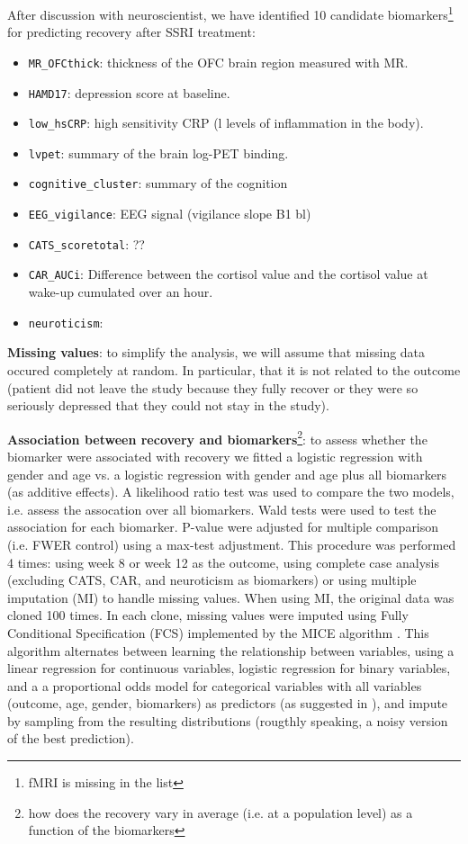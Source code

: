 \documentclass[12pt]{article}
\begin{document}
After discussion with neuroscientist, we have identified 10 candidate
biomarkers\footnote{fMRI is missing in the list} for predicting recovery after SSRI treatment:
\begin{itemize}
\item \texttt{MR\_OFCthick}: thickness of the OFC brain region measured with MR.
\item \texttt{HAMD17}: depression score at baseline.
\item \texttt{low\_hsCRP}: high sensitivity CRP (l levels of inflammation in the body).
\item \texttt{lvpet}: summary of the brain log-PET binding.
\item \texttt{cognitive\_cluster}: summary of the cognition
\item \texttt{EEG\_vigilance}: EEG signal (vigilance slope B1 bl)
\item \texttt{CATS\_scoretotal}: ??
\item \texttt{CAR\_AUCi}: Difference between the cortisol value and the cortisol value at wake-up cumulated over an hour.
\item \texttt{neuroticism}:
\end{itemize}

\bigskip

\textbf{Missing values}: to simplify the analysis, we will assume that
missing data occured completely at random. In particular, that it is
not related to the outcome (patient did not leave the study because
they fully recover or they were so seriously depressed that they could
not stay in the study).

\bigskip

\textbf{Association between recovery and biomarkers}\footnote{how does the
recovery vary in average (i.e. at a population level) as a function of
the biomarkers}: to assess whether the biomarker were associated with
recovery we fitted a logistic regression with gender and age vs. a
logistic regression with gender and age plus all biomarkers (as
additive effects). A likelihood ratio test was used to compare the two
models, i.e. assess the assocation over all biomarkers. Wald tests
were used to test the association for each biomarker. P-value were
adjusted for multiple comparison (i.e. FWER control) using a max-test
adjustment. \newline This procedure was performed 4 times: using week
8 or week 12 as the outcome, using complete case analysis (excluding
CATS, CAR, and neuroticism as biomarkers) or using multiple imputation
(MI) to handle missing values. When using MI, the original data was
cloned 100 times. In each clone, missing values were imputed using
Fully Conditional Specification (FCS) implemented by the MICE
algorithm \citep{van2011mice}. This algorithm alternates between
learning the relationship between variables, using a linear regression
for continuous variables, logistic regression for binary variables,
and a a proportional odds model for categorical variables with all
variables (outcome, age, gender, biomarkers) as predictors (as
suggested in \cite{moons2006using}), and impute by sampling from the
resulting distributions (rougthly speaking, a noisy version of the
best prediction).
\end{document}
